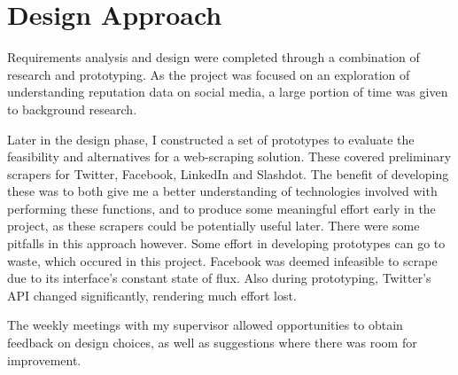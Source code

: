 





\section{Design Approach}

Requirements analysis and design were completed through a combination of research and prototyping. As the project was focused on an exploration of understanding reputation data on social media, a large portion of time was given to background research.

Later in the design phase, I constructed a set of prototypes to evaluate the feasibility and alternatives for a web-scraping solution. These covered preliminary scrapers for Twitter, Facebook, LinkedIn and Slashdot. The benefit of developing these was to both give me a better understanding of technologies involved with performing these functions, and to produce some meaningful effort early in the project, as these scrapers could be potentially useful later. There were some pitfalls in this approach however. Some effort in developing prototypes can go to waste, which occured in this project. Facebook was deemed infeasible to scrape due to its interface's constant state of flux. Also during prototyping, Twitter's API changed significantly, rendering much effort lost.


The weekly meetings with my supervisor allowed opportunities to obtain feedback on design choices, as well as suggestions where there was room for improvement. 

